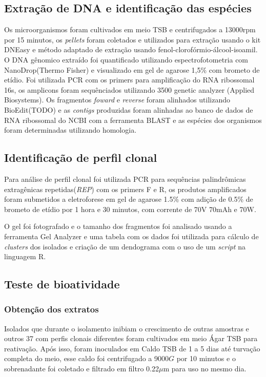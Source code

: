 \subsection{Extração de DNA e identificação das espécies}
Os microorganismos foram cultivados em meio TSB e centrifugados a 13000rpm por 15 minutos,
os \textit{pellets} foram coletados e utilizados para extração usando o kit DNEasy e método
adaptado de extração usando  fenol-clorofórmio-álcool-isoamil. O DNA gênomico extraído
foi quantificado utilizando espectrofotometria com NanoDrop(Thermo Fisher) e visualizado
em gel de agarose 1,5\% com brometo de etídio. 
Foi utilizada PCR com os primers %
para amplificação do RNA ribossomal 16s, os amplicons foram sequênciados utilizando 3500 
genetic analyzer (Applied Biosystems). Os fragmentos \textit{foward} e \textit{reverse}
foram alinhados utilizando BioEdit(TODO) e as \textit{contigs} produzidas foram
alinhadas ao banco de dados de RNA ribossomal do NCBI com a ferramenta BLAST e as espécies
dos organismos foram determinadas utilizando homologia.  

\subsection{Identificação de perfil clonal}
Para análise de perfil clonal foi utilizada PCR para sequências palindrômicas
extragênicas repetidas(\textit{REP}) com os primers F e R, os produtos amplificados
foram submetidos a eletroforese em gel de agarose 1.5\% com adição de 0.5\% de
brometo de etídio por 1 hora e 30 minutos, com corrente de 70V 70mAh e 70W.

O gel foi fotografado e o tamanho dos fragmentos foi analisado usando a ferramenta
Gel Analyzer e uma tabela com os dados foi utilizada para cálculo de \textit{clusters}
dos isolados e criação de um dendograma com o uso de um \textit{script} na
linguagem R.

\subsection{Teste de bioatividade}
\subsubsection{Obtenção dos extratos}
Isolados que durante o isolamento inibiam o crescimento de outras amostras e outros 37
com perfis clonais diferentes foram cultivados em meio Ágar TSB para
reativação. Após isso, foram inoculados em Caldo TSB de 1 a 5 dias até turvação completa
do meio, esse caldo foi centrifugado a 9000$G$ por 10 minutos e o sobrenadante foi coletado
e filtrado em filtro 0.22$\mu$m para uso no mesmo dia.
